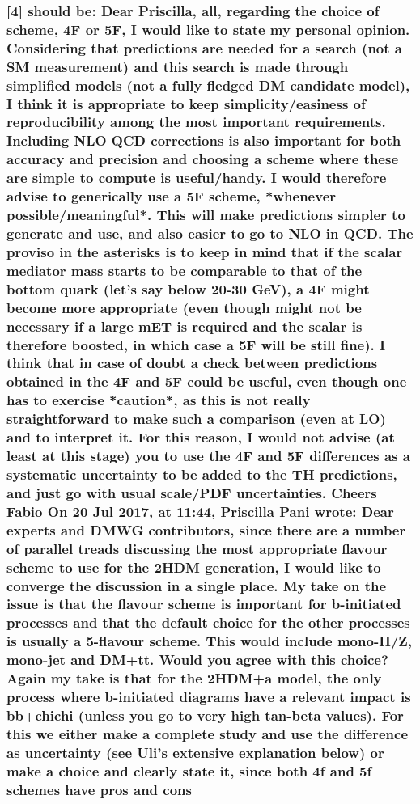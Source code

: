 \subsubsection{{[}4{]} should be: Dear Priscilla, all, regarding the
choice of scheme, 4F or 5F, I would like to state my personal opinion.
Considering that predictions are needed for a search (not a SM
measurement) and this search is made through simplified models (not a
fully fledged DM candidate model), I think it is appropriate to keep
simplicity/easiness of reproducibility among the most important
requirements. Including NLO QCD corrections is also important for both
accuracy and precision and choosing a scheme where these are simple to
compute is useful/handy. I would therefore advise to generically use a
5F scheme, *whenever possible/meaningful*. This will make predictions
simpler to generate and use, and also easier to go to NLO in QCD. The
proviso in the asterisks is to keep in mind that if the scalar mediator
mass starts to be comparable to that of the bottom quark (let's say
below 20-30 GeV), a 4F might become more appropriate (even though might
not be necessary if a large mET is required and the scalar is therefore
boosted, in which case a 5F will be still fine). I think that in case of
doubt a check between predictions obtained in the 4F and 5F could be
useful, even though one has to exercise *caution*, as this is not really
straightforward to make such a comparison (even at LO) and to interpret
it. For this reason, I would not advise (at least at this stage) you to
use the 4F and 5F differences as a systematic uncertainty to be added to
the TH predictions, and just go with usual scale/PDF uncertainties.
Cheers Fabio On 20 Jul 2017, at 11:44, Priscilla Pani wrote: Dear
experts and DMWG contributors, since there are a number of parallel
treads discussing the most appropriate flavour scheme to use for the
2HDM generation, I would like to converge the discussion in a single
place. My take on the issue is that the flavour scheme is important for
b-initiated processes and that the default choice for the other
processes is usually a 5-flavour scheme. This would include mono-H/Z,
mono-jet and DM+tt. Would you agree with this choice? Again my take is
that for the 2HDM+a model, the only process where b-initiated diagrams
have a relevant impact is bb+chichi (unless you go to very high tan-beta
values). For this we either make a complete study and use the difference
as uncertainty (see Uli's extensive explanation below) or make a choice
and clearly state it, since both 4f and 5f schemes have pros and cons
}
